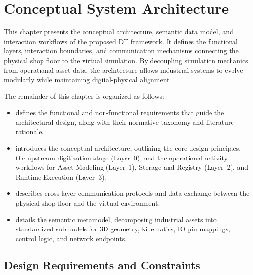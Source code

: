 
%

\chapter{Conceptual System Architecture}
\label{cha:architecture}

This chapter presents the conceptual architecture, semantic data model, and interaction workflows of the proposed \gls{DT} framework. It defines the functional layers, interaction boundaries, and communication mechanisms connecting the physical shop floor to the virtual simulation. By decoupling simulation mechanics from operational asset data, the architecture allows industrial systems to evolve modularly while maintaining digital-physical alignment.

The remainder of this chapter is organized as follows:
\begin{itemize}
    \item {} defines the functional and non-functional requirements that guide the architectural design, along with their normative taxonomy and literature rationale.
    \item {} introduces the conceptual architecture, outlining the core design principles, the upstream digitization stage (Layer~0), and the operational activity workflows for Asset Modeling (Layer~1), Storage and Registry (Layer~2), and Runtime Execution (Layer~3).
    \item {} describes cross-layer communication protocols and data exchange between the physical shop floor and the virtual environment.
    \item {} details the semantic metamodel, decomposing industrial assets into standardized submodels for 3D geometry, kinematics, \gls{IO} pin mappings, control logic, and network endpoints.
\end{itemize}

\section{Design Requirements and Constraints}
\label{sec:design_requirements}

